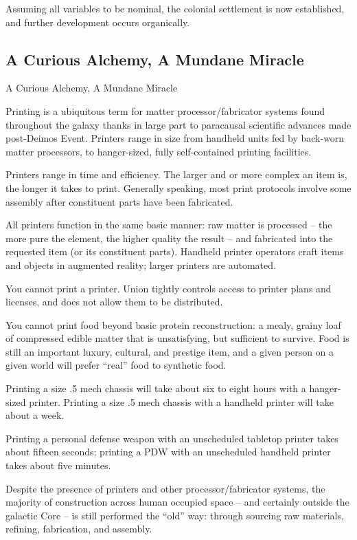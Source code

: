 Assuming all variables to be nominal, the colonial settlement is now established, and further  
development occurs organically.  
 
\subsection{A Curious Alchemy, A Mundane Miracle}
A Curious Alchemy, A Mundane Miracle  

Printing is a ubiquitous term for matter processor/fabricator systems found throughout the  
galaxy thanks in large part to paracausal scientific advances made post-Deimos Event. Printers  
range in size from handheld units fed by back-worn matter processors, to hanger-sized, fully  
self-contained printing facilities. 
 

Printers range in time and efficiency. The larger and or more complex an item is, the longer it  
takes to print. Generally speaking, most print protocols involve some assembly after constituent  
parts have been fabricated. 
 

All printers function in the same basic manner: raw matter is processed -- the more pure the  
element, the higher quality the result -- and fabricated into the requested item (or its constituent  
parts). Handheld printer operators craft items and objects in augmented reality; larger printers  
are automated. 
 

You cannot print a printer. Union tightly controls access to printer plans and licenses, and does  
not allow them to be distributed. 
 

You cannot print food beyond basic protein reconstruction: a mealy, grainy loaf of compressed  
edible matter that is unsatisfying, but sufficient to survive. Food is still an important luxury,  
cultural, and prestige item, and a given person on a given world will prefer “real” food to  
synthetic food. 
 

Printing a size .5 mech chassis will take about six to eight hours with a hanger-sized printer.  
Printing a size .5 mech chassis with a handheld printer will take about a week. 
 

Printing a personal defense weapon with an unscheduled tabletop printer takes about fifteen  
seconds; printing a PDW with an unscheduled handheld printer takes about five minutes. 
 

Despite the presence of printers and other processor/fabricator systems, the majority of  
construction across human occupied space -- and certainly outside the galactic Core -- is still  
performed the “old” way: through sourcing raw materials, refining, fabrication, and assembly. 
 


